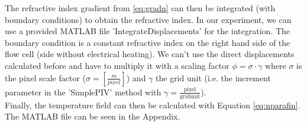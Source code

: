 The refractive index gradient from \ref{eq:gradn} can then be integrated (with boundary conditions) to obtain the refractive index. In our experiment, we can use a provided MATLAB file 'IntegrateDisplacements' for the integration. The boundary condition is a constant refractive index on the right hand side of the flow cell (side without electrical heating). We can't use the direct displacements calculated before and have to multiply it with a scaling factor $\phi=\sigma \cdot \gamma$ where $\sigma$ is the pixel scale factor ($\sigma=[\frac{m}{pixel}]$) and $\gamma$ the grid unit (i.e. the increment parameter in the 'SimplePIV' method with $\gamma=\frac{\text{pixel}}{\text{gridunit}}$).\\

Finally, the temperature field can then be calculated with Equation \ref{eq:nparafin}.
The MATLAB file can be seen in the Appendix.